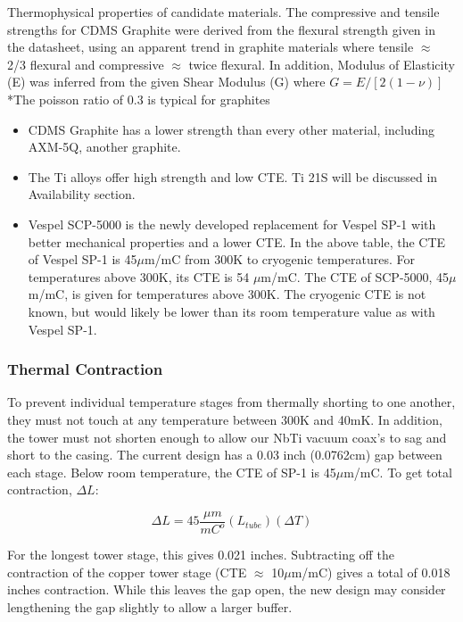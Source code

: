 \documentclass{report}
\begin{document}
\begin{multicols}{2}
\begin{table}[htb]
\begin{threeparttable}
\caption{Thermophysical properties of candidate materials. The compressive and tensile
strengths for CDMS Graphite were derived from the flexural strength given in the datasheet, using an apparent trend in graphite materials where tensile $\approx$ 2/3 flexural and compressive $\approx$ twice flexural. In addition, Modulus of Elasticity (E) was inferred from the given Shear Modulus (G) where $G = E/[2(1-\nu)]$ \\ *The poisson ratio of 0.3 is typical for graphites }
\end{threeparttable}
\end{table}

\begin{itemize}
\item CDMS Graphite has a lower strength than every other material, including AXM-5Q,
another graphite.
\item The Ti alloys offer high strength and low CTE. Ti 21S will be discussed in
Availability section.
\item Vespel SCP-5000 is the newly developed replacement for Vespel SP-1 with better
mechanical properties and a lower CTE. In the above table, the CTE of Vespel SP-1 is
45$\mu$m/mC from 300K to cryogenic temperatures. For temperatures above 300K, its CTE
is 54 $\mu$m/mC. The CTE of SCP-5000, 45$\mu$m/mC, is given for temperatures above 300K.
The cryogenic CTE is not known, but would likely be lower than its room temperature value
as with Vespel SP-1.
\end{itemize}

\subsubsection{Thermal Contraction}


To prevent individual temperature stages from thermally shorting to one another, they must not touch at any temperature between 300K and 40mK. In addition, the tower must not shorten enough to allow our NbTi vacuum coax's to sag and short to the casing. The current design has a 0.03 inch (0.0762cm) gap between each stage. Below room temperature, the CTE of SP-1 is 45$\mu$m/mC. To get total contraction, $\Delta L$:

$$
\Delta L = 45\frac{\mu m}{mC^{o}}(L_{tube})(\Delta T)
$$

For the longest tower stage, this gives 0.021 inches. Subtracting off the contraction of the copper tower stage (CTE $\approx$ 10$\mu$m/mC) gives a total of 0.018 inches contraction. While this leaves the gap open, the new design may consider lengthening the gap slightly to allow a larger buffer.


\end{multicols}
\end{document}
